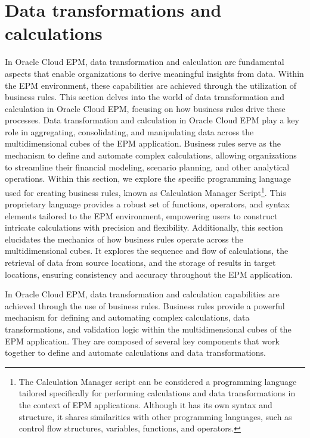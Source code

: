 \documentclass[12pt,a4paper,openright,twoside]{book}
\begin{document}
\section{Data transformations and calculations}

In Oracle Cloud EPM, data transformation and calculation are fundamental aspects that enable organizations to derive meaningful insights from data. 
%
Within the EPM environment, these capabilities are achieved through the utilization of business rules.
%
This section delves into the world of data transformation and calculation in Oracle Cloud EPM, focusing on how business rules drive these processes.
%
Data transformation and calculation in Oracle Cloud EPM play a key role in aggregating, consolidating, and manipulating data across the multidimensional cubes of the EPM application.
%
Business rules serve as the mechanism to define and automate complex calculations, allowing organizations to streamline their financial modeling, scenario planning, and other analytical operations.
%
Within this section, we explore the specific programming language used for creating business rules, known as Calculation Manager Script\footnote{The Calculation Manager script can be considered a programming language tailored specifically for performing calculations and data transformations in the context of EPM applications. Although it has its own syntax and structure, it shares similarities with other programming languages, such as control flow structures, variables, functions, and operators.}. 
%
This proprietary language provides a robust set of functions, operators, and syntax elements tailored to the EPM environment, empowering users to construct intricate calculations with precision and flexibility.
%
Additionally, this section elucidates the mechanics of how business rules operate across the multidimensional cubes. 
%
It explores the sequence and flow of calculations, the retrieval of data from source locations, and the storage of results in target locations, ensuring consistency and accuracy throughout the EPM application.

In Oracle Cloud EPM, data transformation and calculation capabilities are achieved through the use of business rules. 
%
Business rules provide a powerful mechanism for defining and automating complex calculations, data transformations, and validation logic within the multidimensional cubes of the EPM application.
%
They are composed of several key components that work together to define and automate calculations and data transformations. 
\end{document}
